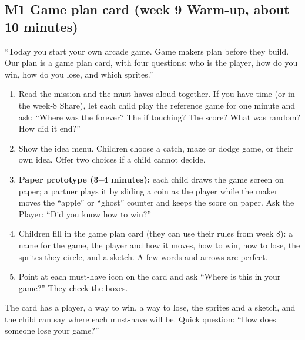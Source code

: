 \documentclass[track=junior,level=2,teacher]{kidscode}
\begin{document}
\subsection{M1 Game plan card (week 9 Warm-up, about 10 minutes)}
\begin{teacherscript}
\enquote{Today you start your own arcade game. Game makers plan before they build. Our plan is a game plan card, with four questions: who is the player, how do you
win, how do you lose, and which sprites.}
\end{teacherscript}
\begin{enumerate}[itemsep=2pt]
  \item Read the mission and the must-haves aloud together. If you have time (or in the week-8 Share),
        let each child play the reference game for one minute and ask: \enquote{Where was the forever?
        The if touching? The score? What was random? How did it end?}
  \item Show the idea menu. Children choose a catch, maze or dodge game, or their own idea. Offer two
        choices if a child cannot decide.
  \item \textbf{Paper prototype (3--4 minutes):} each child draws the game screen on paper; a partner plays
        it by sliding a coin as the player while the maker moves the \enquote{apple} or \enquote{ghost}
        counter and keeps the score on paper. Ask the Player: \enquote{Did you know how to win?}
  \item Children fill in the game plan card (they can use their rules from week 8): a name for the game, the player and how it moves, how to
        win, how to lose, the sprites they circle, and a sketch. A few words and arrows are perfect.
  \item Point at each must-have icon on the card and ask \enquote{Where is this in your game?} They check the boxes.
\end{enumerate}
\begin{formativecheck}
The card has a player, a way to win, a way to lose, the sprites and a sketch, and the child can say
where each must-have will be. Quick question: \enquote{How does someone lose your game?}
\end{formativecheck}
\end{document}
